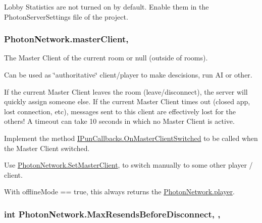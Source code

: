 Lobby Statistics are not turned on by default. Enable them in the Photon\+Server\+Settings file of the project. 
\subsubsection[{\texorpdfstring{master\+Client}{masterClient}}]{ Photon\+Network.\+master\+Client\hspace{0.3cm}{\ttfamily [static]}, {\ttfamily [get]}}\hypertarget{class_photon_network_aa7e51b5e5f9f8b89f057096f47d11c5b}{}\label{class_photon_network_aa7e51b5e5f9f8b89f057096f47d11c5b}


The Master Client of the current room or null (outside of rooms). 

Can be used as \char`\"{}authoritative\char`\"{} client/player to make descisions, run AI or other.

If the current Master Client leaves the room (leave/disconnect), the server will quickly assign someone else. If the current Master Client times out (closed app, lost connection, etc), messages sent to this client are effectively lost for the others! A timeout can take 10 seconds in which no Master Client is active.

Implement the method \hyperlink{interface_i_pun_callbacks_abee2c86784a9a700b9f5b4073bd00be7}{I\+Pun\+Callbacks.\+On\+Master\+Client\+Switched} to be called when the Master Client switched.

Use \hyperlink{class_photon_network_a85b058bab4a369d0c5730cf43b462962}{Photon\+Network.\+Set\+Master\+Client}, to switch manually to some other player / client.

With offline\+Mode == true, this always returns the \hyperlink{class_photon_network_a1b3803f17c6d713593bca41547b8b9b3}{Photon\+Network.\+player}. 
\subsubsection[{\texorpdfstring{Max\+Resends\+Before\+Disconnect}{MaxResendsBeforeDisconnect}}]{\setlength{\rightskip}{0pt plus 5cm}int Photon\+Network.\+Max\+Resends\+Before\+Disconnect\hspace{0.3cm}{\ttfamily [static]}, {\ttfamily [get]}, {\ttfamily [set]}}\hypertarget{class_photon_network_ad86d4af661dd7365f6e172e106ca7cb2}{}\label{class_photon_network_ad86d4af661dd7365f6e172e106ca7cb2}


